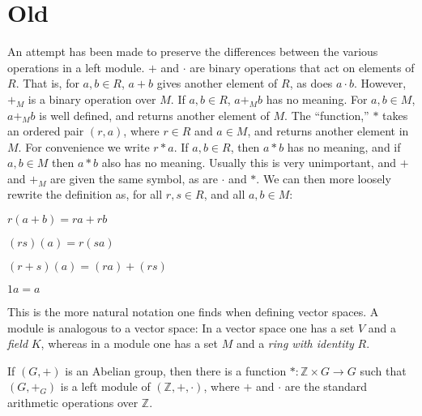\section{Old}
    An attempt has been made to preserve the differences
    between the various operations in a left module.
    $+$ and $\cdot$ are binary operations that act on
    elements of $R$. That is, for $a,b\in{R}$, $a+b$
    gives another element of $R$, as does $a\cdot{b}$.
    However, $+_{M}$ is a binary operation over
    $M$. If $a,b\in{R}$, $a+_{M}b$ has no meaning.
    For $a,b\in{M}$, $a+_{M}b$ is well defined, and returns
    another element of $M$. The ``function,'' $*$
    takes an ordered pair $(r,a)$, where $r\in{R}$ and
    $a\in{M}$, and returns another element in $M$. For
    convenience we write $r*a$. If $a,b\in{R}$, then
    $a*b$ has no meaning, and if $a,b\in{M}$ then
    $a*b$ also has no meaning. Usually this is very
    unimportant, and $+$ and $+_{M}$ are given the same
    symbol, as are $\cdot$ and $*$. We can then more loosely
    rewrite the definition as, for all $r,s\in{R}$, and
    all $a,b\in{M}$:
    \begin{enumerate}
        \begin{multicols}{2}
            \item $r(a+b)=ra+rb$
            \item $(rs)(a)=r(sa)$
            \item $(r+s)(a)=(ra)+(rs)$
            \item $1a=a$
        \end{multicols}
    \end{enumerate}
    This is the more natural notation one finds when defining
    vector spaces. A module is analogous to a vector space:
    In a vector space one has a set $V$ and a
    \textit{field} $K$, whereas in a module one has a set
    $M$ and a \textit{ring with identity} $R$.
    \begin{theorem}
        If $(G,+)$ is an Abelian group, then there is a
        function $*:\mathbb{Z}\times{G}\rightarrow{G}$
        such that $(G,+_{G})$ is a left module of
        $(\mathbb{Z},+,\cdot)$, where $+$ and $\cdot$ are
        the standard arithmetic operations over $\mathbb{Z}$.
    \end{theorem}
